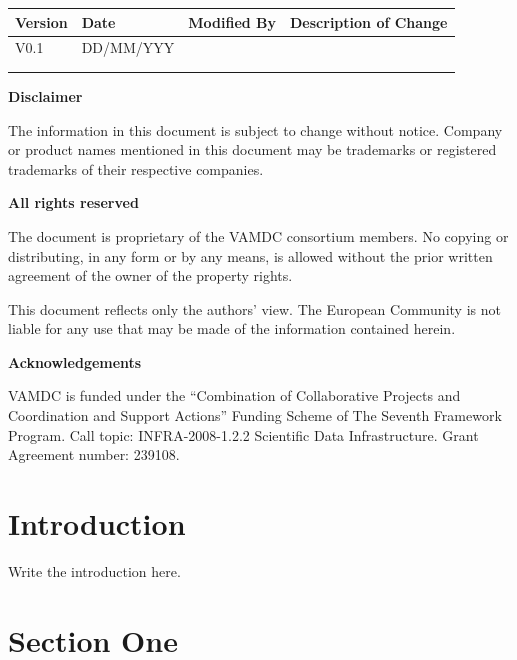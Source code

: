 \documentclass{article}
\begin{document}
\textbf{}

\noindent \begin{tabular}{|l|l|l|l|} 
\hline 
\textbf{Version} & \textbf{Date} & \textbf{Modified By} & \textbf{Description of Change} \\ \hline 
V0.1 & DD/MM/YYY &  &  \\ \hline 
 &  &  &  \\ \hline 
 &  &  &  \\ \hline 
\end{tabular}

\textbf{}

\noindent \textbf{Disclaimer}

\noindent The information in this document is subject to change without notice. Company or product names mentioned in this document may be trademarks or registered trademarks of their respective companies.


\textbf{}

\noindent \textbf{All rights reserved}

\noindent The document is proprietary of the VAMDC consortium members. No copying or distributing, in any form or by any means, is allowed without the prior written agreement of the owner of the property rights.

\noindent 

\noindent This document reflects only the authors' view. The European Community is not liable for any use that may be made of the information contained herein.

\textbf{}

\noindent \textbf{Acknowledgements}

\noindent VAMDC is funded under the ``Combination of Collaborative Projects and Coordination and  Support Actions'' Funding Scheme of The Seventh Framework Program. Call topic: INFRA-2008-1.2.2 Scientific Data Infrastructure. Grant Agreement number: 239108.

\textbf{}

\newpage

\tableofcontents

\newpage

\section*{Introduction}

\noindent Write the introduction here.

\section{Section One}
\end{document}
